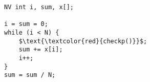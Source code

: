 \documentclass[border={20pt 5pt 21pt 10pt}]{standalone} %
\begin{document}
	

\begin{lstlisting}[style=mystyle, linewidth=115px]
NV int i, sum, x[];

i = sum = 0;
while (i < N) {
    $\text{\textcolor{red}{checkp()}}$;
    sum += x[i];
    i++;
}
sum = sum / N;
\end{lstlisting} 
\end{document}
